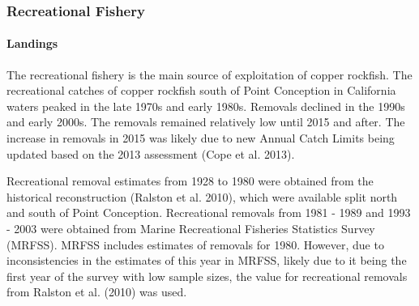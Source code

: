 \documentclass[11pt,
  english,
  a4paper,
]{article}
\begin{document}
\hypertarget{recreational-fishery}{%
\subsubsection{Recreational Fishery}\label{recreational-fishery}}

\leavevmode\tagmcend\tagstructend


\hypertarget{landings-1}{%
\paragraph{Landings}\label{landings-1}}

\leavevmode\tagmcend\tagstructend


The recreational fishery is the main source of exploitation of copper rockfish. The recreational catches of copper rockfish south of Point Conception in California waters peaked in the late 1970s and early 1980s. Removals declined in the 1990s and early 2000s. The removals remained relatively low until 2015 and after. The increase in removals in 2015 was likely due to new Annual Catch Limits being updated based on the 2013 assessment {(Cope et al. 2013)\leavevmode\tagmcend\tagstructend}.

\leavevmode\tagmcend\tagstructend\par


Recreational removal estimates from 1928 to 1980 were obtained from the historical reconstruction {(Ralston et al. 2010)\leavevmode\tagmcend\tagstructend}, which were available split north and south of Point Conception. Recreational removals from 1981 - 1989 and 1993 - 2003 were obtained from Marine Recreational Fisheries Statistics Survey (MRFSS). MRFSS includes estimates of removals for 1980. However, due to inconsistencies in the estimates of this year in MRFSS, likely due to it being the first year of the survey with low sample sizes, the value for recreational removals from Ralston et al. {(2010)\leavevmode\tagmcend\tagstructend} was used.

\leavevmode\tagmcend\tagstructend\par
\end{document}
